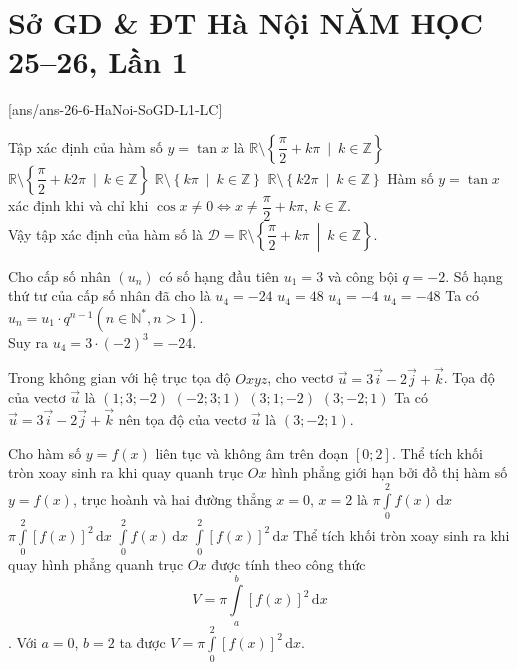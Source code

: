 \section{Sở GD \& ĐT Hà Nội NĂM HỌC 25--26, Lần 1}
\caulc
{}[ans/ans-26-6-HaNoi-SoGD-L1-LC]
\begin{ex}%
	Tập xác định của hàm số $y=\tan x$ là
	\choice
	{\True $\mathbb{R}\setminus\left\{\dfrac{\pi}{2}+k\pi \ \mid\ k\in\mathbb{Z}\right\}$}
	{$\mathbb{R}\setminus\left\{\dfrac{\pi}{2}+k2\pi \ \mid\ k\in\mathbb{Z}\right\}$}
	{$\mathbb{R}\setminus\left\{k\pi \ \mid\ k\in\mathbb{Z}\right\}$}
	{$\mathbb{R}\setminus\left\{k2\pi \ \mid\ k\in\mathbb{Z}\right\}$}
	\loigiai
	{
	Hàm số $y=\tan x$ xác định khi và chỉ khi $\cos x \ne 0 \Leftrightarrow x \ne \dfrac{\pi}{2}+k\pi,\ k\in\mathbb{Z}$.\\
	Vậy tập xác định của hàm số là $\mathscr{D}=\mathbb{R}\setminus\left\{\dfrac{\pi}{2}+k\pi \ \middle|\ k\in\mathbb{Z}\right\}$.
	}
\end{ex}
		
\begin{ex}%
	Cho cấp số nhân $(u_n)$ có số hạng đầu tiên $u_1=3$ và công bội $q=-2$. 
	Số hạng thứ tư của cấp số nhân đã cho là
	\choice
	{\True $u_4=-24$}
	{$u_4=48$}
	{$u_4=-4$}
	{$u_4=-48$}
	\loigiai
	{
	Ta có $	u_n=u_1\cdot q^{n-1} (n\in \mathbb{N}^*,n>1)$.\\
	Suy ra $u_4=3\cdot(-2)^3=-24$.
	}
\end{ex}
	
\begin{ex}%
	Trong không gian với hệ trục tọa độ $Oxyz$, cho vectơ $\vec{u}=3\vec{i}-2\vec{j}+\vec{k}$. Tọa độ của vectơ $\vec{u}$ là
	\choice
	{$(1;3;-2)$}
	{$(-2;3;1)$}
	{$(3;1;-2)$}
	{\True $(3;-2;1)$}
	\loigiai
	{
	Ta có $\vec{u}=3\vec{i}-2\vec{j}+\vec{k} $ nên tọa độ của vectơ $\vec{u}$ là $(3;-2;1)$.
	}
\end{ex}
		
\begin{ex}%
	Cho hàm số $y=f(x)$ liên tục và không âm trên đoạn $[0;2]$. Thể tích khối tròn xoay sinh ra khi quay quanh trục $Ox$ hình phẳng giới hạn bởi đồ thị hàm số $y=f(x)$, trục hoành và hai đường thẳng $x=0$, $x=2$ là
	\choice
	{$\pi\displaystyle\int\limits_0^2 f(x)\mathrm{\,d}x$}
	{\True $\pi\displaystyle\int\limits_0^2 \left[f(x)\right]^2\mathrm{\,d}x$}
	{$\displaystyle\int\limits_0^2 f(x)\mathrm{\,d}x$}
	{$\displaystyle\int\limits_0^2 \left[f(x)\right]^2\mathrm{\,d}x$}
	\loigiai
	{
	Thể tích khối tròn xoay sinh ra khi quay hình phẳng quanh trục $Ox$ được tính theo công thức \[ V=\pi \displaystyle \int\limits_a^b \left[f(x)\right]^2\mathrm{\,d}x\].
	Với $a=0$, $b=2$ ta được $V=\pi \displaystyle \int\limits_0^2 \left[f(x)\right]^2\mathrm{\,d}x.	$
	}
\end{ex}

